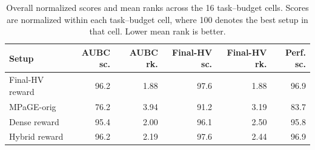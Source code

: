 \begin{table}[H]
\centering
\caption[Overall four-setup comparison]{Overall normalized scores and mean ranks across the 16 task--budget cells. Scores are normalized within each task--budget cell, where 100 denotes the best setup in that cell. Lower mean rank is better.}
\label{tab:all-overall-scores}
\small
\setlength{\tabcolsep}{4pt}
\centering
\begin{tabular}{lrrrrr}
\toprule
Setup & AUBC sc. & AUBC rk. & Final-HV sc. & Final-HV rk. & Perf. sc. \\
\midrule
Final-HV reward & 96.2 & 1.88 & 97.6 & 1.88 & 96.9 \\
MPaGE-orig & 76.2 & 3.94 & 91.2 & 3.19 & 83.7 \\
Dense reward & 95.4 & 2.00 & 96.1 & 2.50 & 95.8 \\
Hybrid reward & 96.2 & 2.19 & 97.6 & 2.44 & 96.9 \\
\bottomrule
\end{tabular}
\end{table}
